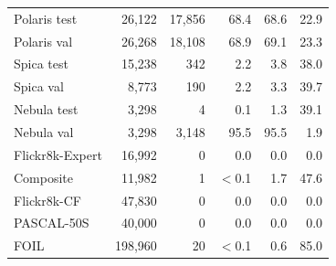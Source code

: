 \begin{tabular}{lrrrrr}
\quad Polaris test & 26,122 & 17,856 & 68.4 & 68.6 & 22.9 \\
\quad Polaris val & 26,268 & 18,108 & 68.9 & 69.1 & 23.3 \\
\quad Spica test & 15,238 & 342 & 2.2 & 3.8 & 38.0 \\
\quad Spica val & 8,773 & 190 & 2.2 & 3.3 & 39.7 \\
\quad Nebula test & 3,298 & 4 & 0.1 & 1.3 & 39.1 \\
\quad Nebula val & 3,298 & 3,148 & 95.5 & 95.5 & 1.9 \\
\quad Flickr8k-Expert & 16,992 & 0 & 0.0 & 0.0 & 0.0 \\
\quad Composite & 11,982 & 1 & $<$0.1 & 1.7 & 47.6 \\
\quad Flickr8k-CF & 47,830 & 0 & 0.0 & 0.0 & 0.0 \\
\quad PASCAL-50S & 40,000 & 0 & 0.0 & 0.0 & 0.0 \\
\quad FOIL & 198,960 & 20 & $<$0.1 & 0.6 & 85.0 \\
\bottomrule
\end{tabular}
